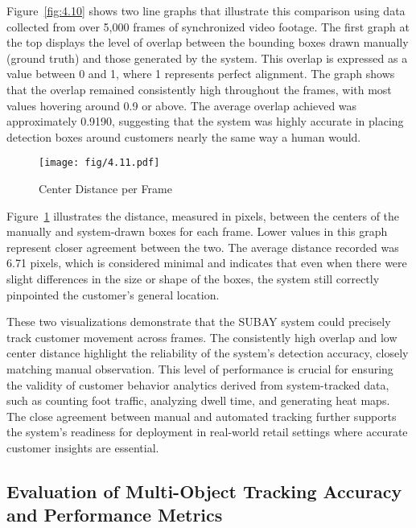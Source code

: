{Figure~\ref{fig:4.10} shows two line graphs that illustrate this comparison using data collected from over 5,000 frames of synchronized video footage. The first graph at the top displays the level of overlap between the bounding boxes drawn manually (ground truth) and those generated by the system. This overlap is expressed as a value between 0 and 1, where 1 represents perfect alignment. The graph shows that the overlap remained consistently high throughout the frames, with most values hovering around 0.9 or above. The average overlap achieved was approximately 0.9190, suggesting that the system was highly accurate in placing detection boxes around customers nearly the same way a human would.

\begin{figure}[H]
	\caption[Center Distance per Frame]{\newline \newline Center Distance per Frame}
	\centering
	\texttt{[image: fig/4.11.pdf]}
	\label{fig:4.11}
\end{figure}

Figure~\ref{fig:4.11} illustrates the distance, measured in pixels, between the centers of the manually and system-drawn boxes for each frame. Lower values in this graph represent closer agreement between the two. The average distance recorded was 6.71 pixels, which is considered minimal and indicates that even when there were slight differences in the size or shape of the boxes, the system still correctly pinpointed the customer's general location.

These two visualizations demonstrate that the SUBAY system could precisely track customer movement across frames. The consistently high overlap and low center distance highlight the reliability of the system’s detection accuracy, closely matching manual observation. This level of performance is crucial for ensuring the validity of customer behavior analytics derived from system-tracked data, such as counting foot traffic, analyzing dwell time, and generating heat maps. The close agreement between manual and automated tracking further supports the system’s readiness for deployment in real-world retail settings where accurate customer insights are essential.

\subsection{Evaluation of Multi-Object Tracking Accuracy and Performance Metrics}

}
